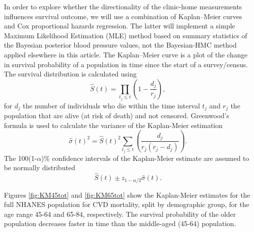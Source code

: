 \documentclass[
]{article}
\begin{document}
In order to explore whether the directionality of the clinic-home measurements influences survival outcome, we will use a combination of Kaplan--Meier curves and Cox proportional hazards regression.
The latter will implement a simple Maximum Likelihood Estimation (MLE) method based on summary statistics of the Bayesian posterior blood pressure values, not the Bayesian-HMC method applied elsewhere in this article.
The Kaplan--Meier curve is a plot of the change in survival probability of a population in time since the start of a survey/census.
The survival distribution is calculated using
\begin{equation}\label{survKM}
\hat{S}(t)=\prod_{t_j \le t}\left(1-\frac{d_j}{r_j} \right),
\end{equation}
for \(d_j\) the number of individuals who die within the time interval \(t_j\) and \(r_j\) the population that are alive (at risk of death) and not censored. Greenwood's formula is used to calculate the variance of the Kaplan-Meier estimation
\begin{equation}\label{sigKM}
\hat{\sigma}(t)^2=\hat{S}(t)^2\sum_{t_j \le t}\left(\frac{d_j}{r_j(r_j-d_j)} \right).
\end{equation}
The 100(1-\(\alpha\))\% confidence intervals of the Kaplan-Meier estimate are assumed to be normally distributed
\begin{equation}\label{CIKM}
\hat{S}(t) \pm z_{1-\alpha/2}\hat{\sigma}(t).
\end{equation}

Figures \ref{fig:KM45tot} and \ref{fig:KM65tot} show the Kaplan-Meier estimates for the full NHANES population for CVD mortality, split by demographic group, for the age range 45-64 and 65-84, respectively. The survival probability of the older population decreases faster in time than the middle-aged (45-64) population.
\end{document}
